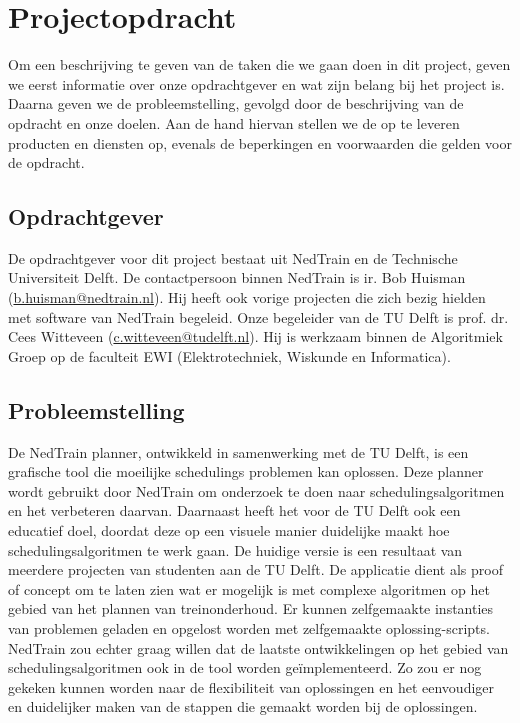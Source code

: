\section{Projectopdracht}
Om een beschrijving te geven van de taken die we gaan doen in dit project, geven we eerst informatie over onze opdrachtgever en wat zijn belang bij het project is. Daarna geven we de probleemstelling, gevolgd door de beschrijving van de opdracht en onze doelen. Aan de hand hiervan stellen we de op te leveren producten en diensten op, evenals de beperkingen en voorwaarden die gelden voor de opdracht.

\subsection{Opdrachtgever}
De opdrachtgever voor dit project bestaat uit NedTrain en de Technische Universiteit Delft.
De contactpersoon binnen NedTrain is ir. Bob Huisman (\href{mailto:b.huisman@nedtrain.nl}{b.huisman@nedtrain.nl}). Hij heeft ook vorige projecten die zich bezig hielden met software van NedTrain begeleid. Onze begeleider van de TU Delft is prof. dr. Cees Witteveen (\href{mailto:c.witteveen@tudelft.nl}{c.witteveen@tudelft.nl}). Hij is werkzaam binnen de Algoritmiek Groep op de faculteit EWI (Elektrotechniek, Wiskunde en Informatica).

\subsection{Probleemstelling}
De NedTrain planner, ontwikkeld in samenwerking met de TU Delft, is een grafische tool die moeilijke schedulings problemen kan oplossen. Deze planner wordt gebruikt door NedTrain om onderzoek te doen naar schedulingsalgoritmen en het verbeteren daarvan. Daarnaast heeft het voor de TU Delft ook een educatief doel, doordat deze op een visuele manier duidelijke maakt hoe schedulingsalgoritmen te werk gaan. De huidige versie is een resultaat van meerdere projecten van studenten aan de TU Delft. De applicatie dient als proof of concept om te laten zien wat er mogelijk is met complexe algoritmen op het gebied van het plannen van treinonderhoud. Er kunnen zelfgemaakte instanties van problemen geladen en opgelost worden met zelfgemaakte oplossing-scripts. NedTrain zou echter graag willen dat de laatste ontwikkelingen op het gebied van schedulingsalgoritmen ook in de tool worden ge\"implementeerd. Zo zou er nog gekeken kunnen worden naar de flexibiliteit van oplossingen en het eenvoudiger en duidelijker maken van de stappen die gemaakt worden bij de oplossingen. 

